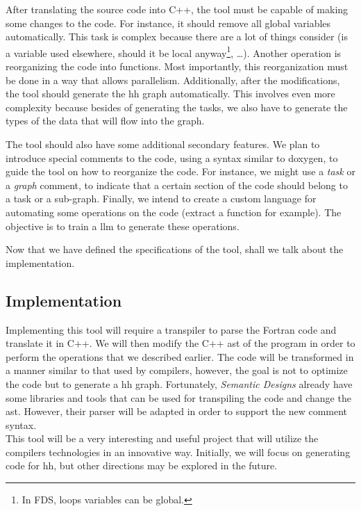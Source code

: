 After translating the source code into C++, the tool must be capable of making
some changes to the code. For instance, it should remove all global variables
automatically. This task is complex because there are a lot of things consider
(is a variable used elsewhere, should it be local anyway\footnote{In FDS, loops
variables can be global.}, \dots). Another operation is reorganizing the code
into functions. Most importantly, this reorganization must be done in a way that
allows parallelism. Additionally, after the modifications, the tool should
generate the \gls{hh} graph automatically. This involves even more complexity
because besides of generating the tasks, we also have to generate the types of
the data that will flow into the graph.

The tool should also have some additional secondary features. We plan to
introduce special comments to the code, using a syntax similar to doxygen, to
guide the tool on how to reorganize the code. For instance, we might use a
\textit{task} or a \textit{graph} comment, to indicate that a certain section of
the code should belong to a task or a sub-graph. Finally, we intend to create a
custom language for automating some operations on the code (extract a function
for example). The objective is to train a \gls{llm} to generate these
operations.

Now that we have defined the specifications of the tool, shall we talk about the
implementation.

\subsection{Implementation}

Implementing this tool will require a transpiler to parse the Fortran code and
translate it in C++. We will then modify the C++ \gls{ast} of the program in
order to perform the operations that we described earlier. The code will be
transformed in a manner similar to that used by compilers, however, the goal is
not to optimize the code but to generate a \gls{hh} graph. Fortunately,
\textit{Semantic Designs} already have some libraries and tools that can be used
for transpiling the code and change the \gls{ast}. However, their \gls{parser}
will be adapted in order to support the new comment syntax.\\

This tool will be a very interesting and useful project that will utilize the
compilers technologies in an innovative way. Initially, we will focus on
generating code for \gls{hh}, but other directions may be explored in the
future.
